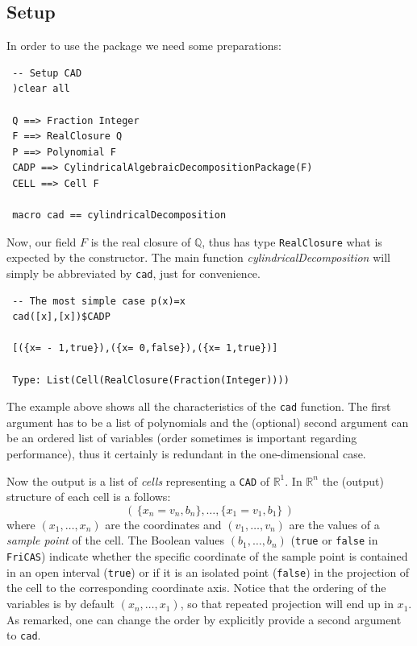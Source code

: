 \documentclass[12pt,a4paper]{article}
\newcommand{\RR}[1]{\mathbb{R}^{#1}}
\begin{document}
\subsection{Setup}
In order to use the package we need some preparations:
%
\begin{lstlisting}
 -- Setup CAD
 )clear all

 Q ==> Fraction Integer
 F ==> RealClosure Q
 P ==> Polynomial F
 CADP ==> CylindricalAlgebraicDecompositionPackage(F)
 CELL ==> Cell F

 macro cad == cylindricalDecomposition

\end{lstlisting}
%
Now, our field $F$ is the real closure of $\mathbb Q$, thus has type 
{\tt RealClosure} what is expected by the constructor. The main function 
{\em cylindricalDecomposition} will simply be abbreviated by {\tt cad}, just
for convenience.
%
\begin{lstlisting}
 -- The most simple case p(x)=x
 cad([x],[x])$CADP

 [({x= - 1,true}),({x= 0,false}),({x= 1,true})]
 
 Type: List(Cell(RealClosure(Fraction(Integer))))
\end{lstlisting}
% 
The example above shows all the characteristics of the {\tt cad} function. The
first argument has to be a list of polynomials and the (optional) second argument
can be an ordered list of variables (order sometimes is important regarding
performance), thus it certainly is redundant in the one-dimensional case. 

Now the output is a list of {\em cells} representing a {\tt CAD} of $\RR 1$.
In $\RR n$ the (output) structure of each cell is a follows:
%
\begin{equation}
    (\, \{x_n = v_n, b_n\}, \ldots,  \{x_1 = v_1, b_1\} \,) 
\end{equation}
%
where $(x_1,\ldots,x_n)$ are the coordinates and $(v_1,\ldots,v_n)$ are
the values of a {\em sample point} of the cell. The Boolean values
$(b_1,\ldots,b_n)$ ({\tt true} or {\tt false} in {\tt FriCAS}) indicate
whether the specific coordinate of the sample point is contained in an 
open interval ({\tt true}) or if it is an isolated point ({\tt false})
in the projection of the cell to the corresponding coordinate axis. Notice
that the ordering of the variables is by default $(x_n,\ldots,x_1)$, so
that repeated projection will end up in $x_1$. As remarked, one can change
the order by explicitly provide a second argument to {\tt cad}.   
\end{document}
